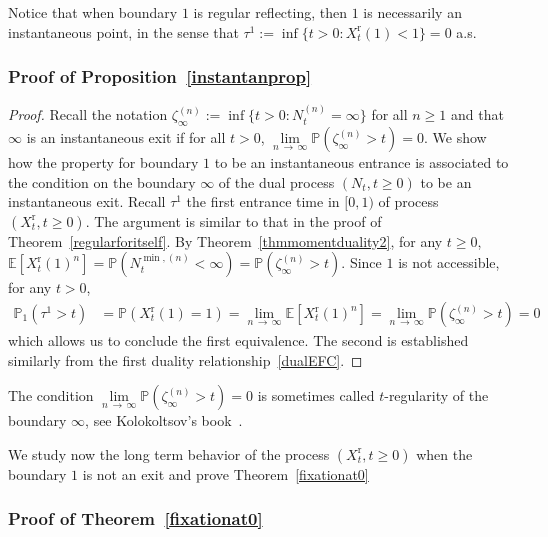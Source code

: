 \documentclass[AHL,Unicode,longabstracts,published]{cedram}
\newcommand{\rmr}{\mathrm{r}}
\newcommand{\bbE}{\mathbb{E}}
\newcommand{\bbP}{\mathbb{P}}
\begin{document}
Notice that when boundary $1$ is regular reflecting, then $1$ is necessarily an instantaneous point, in the sense that $\tau^{1}:=\inf\{t>0: X_t^{\rmr}(1)<1\}=0$ a.s.


\subsubsection{Proof of Proposition~\ref{instantanprop}}

\begin{proof}
Recall the notation $\zeta_\infty^{(n)}:=\inf\{t>0: N_t^{(n)}=\infty\}$ for all $n\geq 1$ and that $\infty$ is an instantaneous exit if for all $t>0$, $\underset{n\,\rightarrow\,\infty}{\lim} \bbP(\zeta_\infty^{(n)}>t)=0$. We show how the property for boundary $1$ to be an instantaneous entrance is associated to the condition on the boundary $\infty$ of the dual process $(N_t,t\geq 0)$ to be an instantaneous exit. Recall $\tau^1$ the first entrance time in $[0,1)$ of process $(X_t^{\rmr},t\geq 0)$. The argument is similar to that in the proof of Theorem~\ref{regularforitself}. By Theorem~\ref{thmmomentduality2}, for any $t\geq 0$, $\bbE[X^{\rmr}_t(1)^{n}]=\bbP(N_t^{\min,(n)}<\infty)=\bbP(\zeta^{(n)}_\infty>t)$. Since $1$ is not accessible, for any $t>0$,
\begin{align*}
\bbP_1\left(\tau^1>t\right)&=\bbP\left(X_t^{\rmr}(1)=1\right)=\underset{n\,\rightarrow\,\infty}{\lim}\bbE\left[X^{\rmr}_t(1)^{n}\right]=\underset{n\,\rightarrow\,\infty}{\lim} \bbP\left(\zeta^{(n)}_\infty>t\right)=0
\end{align*}
which allows us to conclude the first equivalence. The second is established similarly from the first duality relationship~\eqref{dualEFC}. 
\end{proof}

\begin{rema}
The condition $\underset{n\,\rightarrow\,\infty}{\lim} \bbP(\zeta_\infty^{(n)}>t)=0$ is sometimes called $t$-regularity of the boundary $\infty$, see Kolokoltsov's book~\cite[Section~6.1, page~273]{MarkovProcessesSemigroupsandGenerators}.
\end{rema}

We study now the long term behavior of the process $(X_t^{\rmr},t\geq 0)$ when the boundary $1$ is not an exit and prove Theorem~\ref{fixationat0}

\subsubsection{Proof of Theorem~\ref{fixationat0}}
\end{document}
